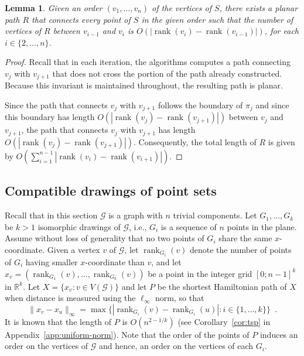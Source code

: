 \documentclass[11pt]{patmorin}
\newtheorem{lemma}[theorem]{Lemma}
\DeclareMathOperator{\rank}{rank}
\begin{document}
\begin{lemma}\label{lemma:Compatible augmentation for trivial components}
Given an order $(v_1, \ldots, v_n)$ of the vertices of $S$, there exists a planar path $R$ that connects every point of $S$ in the given order such that the number of vertices of $R$ between $v_{i-1}$ and $v_{i}$ is $O(|\rank(v_i) - \rank(v_{i-1})|)$, for each $i\in \{2,\dots,n\}$.
\end{lemma}
\begin{proof}
Recall that in each iteration, the algorithms computes a path connecting $v_j$ with $v_{j+1}$ that does not cross the portion of the path already constructed. Because this invariant is maintained throughout, the resulting path is planar.

Since the path that connects $v_j$ with $v_{j+1}$ follows the boundary of $\pi_j$ and since this boundary has length $O(|\rank(v_j) - \rank(v_{j+1})|)$ between $v_j$ and $v_{j+1}$, the path that connects $v_j$ with $v_{j+1}$ has length $O(|\rank(v_j) - \rank(v_{j+1})|)$. Consequently,  the total length of $R$ is given by $O\left(\sum_{i=1}^{n-1} |\rank(v_i) - \rank(v_{i+1}) |\right)$.
\end{proof}



\subsection{Compatible drawings of point sets}

Recall that in this section $\mathcal G$ is a graph with $n$ trivial components.
Let $G_1, \ldots, G_k$ be $k>1$ isomorphic drawings of $\mathcal G$, i.e., $G_i$ is a sequence of $n$ points in the plane.
Assume without loss of generality that no two points of $G_i$ share the same $x$-coordinate.
Given a vertex $v$ of $\mathcal G$, let $\rank_{G_i}(v)$ denote the number of points of $G_i$ having smaller $x$-coordinate than $v$, and let $x_v = (\rank_{G_1}(v), \ldots, \rank_{G_k}(v))$ be a point in the integer grid $[0;n-1]^k$ in $\mathbb{R}^k$.  Let $X = \{x_v : v\in V(\mathcal G)\}$ and let $P$ be the shortest Hamiltonian path of $X$ when distance is measured using the $\ell_\infty$ norm, so that
\[
   \|x_v-x_u\|_\infty = \max\{|\rank_{G_i}(v)-\rank_{G_i}(u)|:i\in\{1,\ldots,k\}\} \enspace .
\]
It is known that the length of $P$ is $O(n^{2-1/k})$ (see
Corollary~\ref{cor:tsp} in Appendix~\ref{app:uniform-norm}).  Note that
the order of the points of $P$ induces an order on the vertices of
$\mathcal G$ and hence, an order on the vertices of each $G_i$.
\end{document}
